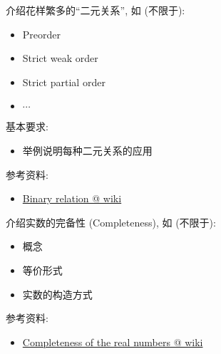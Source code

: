 \documentclass[a4paper, justified]{tufte-handout}
\begin{document}
\begin{ot}[二元关系]
  介绍花样繁多的``二元关系'', 如 (不限于):
  \begin{itemize}
    \item Preorder
    \item Strict weak order
    \item Strict partial order
    \item $\cdots$
  \end{itemize}

  \noindent 基本要求:
  \begin{itemize}
    \item 举例说明每种二元关系的应用
  \end{itemize}

  \noindent 参考资料:
  \begin{itemize}
    \item \href{https://en.wikipedia.org/wiki/Binary\_relation}{Binary relation @ wiki}
  \end{itemize}
\end{ot}
\vspace{0.50cm}
\begin{ot}[实数]
  介绍实数的完备性 (Completeness), 如 (不限于):
  \begin{itemize}
    \item 概念
    \item 等价形式
    \item 实数的构造方式
  \end{itemize}

  \noindent 参考资料:
  \begin{itemize}
    \item \href{https://en.wikipedia.org/wiki/Completeness\_of\_the\_real\_numbers}{Completeness of the real numbers @ wiki}
  \end{itemize}
\end{ot}

\begincorrection


\beginfb

\end{document}
